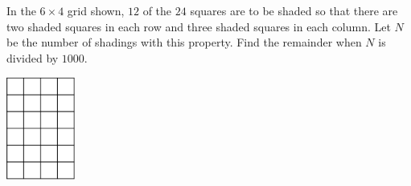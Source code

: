 In the $ 6\times4$ grid shown, $ 12$ of the $ 24$ squares are to be shaded so that there are two shaded squares in each row and three shaded squares in each column.  Let $ N$ be the number of shadings with this property.  Find the remainder when $ N$ is divided by $ 1000$.
\begin{center}
\includegraphics[width = 22.400000000000002mm]{img/fig0.png}
\end{center}
